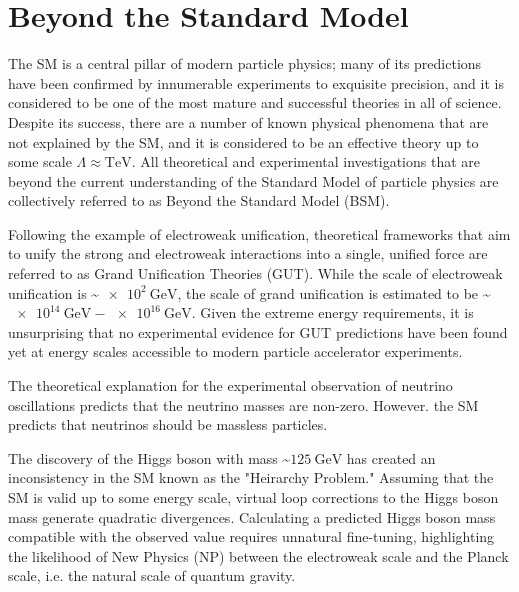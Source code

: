 \section{Beyond the Standard Model}
The SM is a central pillar of modern particle physics; many of its predictions have been confirmed by innumerable experiments to exquisite precision, and it is considered to be one of the most mature and successful theories in all of science.
Despite its success, there are a number of known physical phenomena that are not explained by the SM, and it is considered to be an effective theory up to some scale $\Lambda \approx \si{\TeV}$.
All theoretical and experimental investigations that are beyond the current understanding of the Standard Model of particle physics are collectively referred to as Beyond the Standard Model (BSM).

Following the example of electroweak unification, theoretical frameworks that aim to unify the strong and electroweak interactions into a single, unified force are referred to as Grand Unification Theories (GUT).
While the scale of electroweak unification is \sim$\SI{e2}{\GeV}$, the scale of grand unification is estimated to be \sim$\SI{e14}{\GeV} - \SI{e16}{\GeV}$.
Given the extreme energy requirements, it is unsurprising that no experimental evidence for GUT predictions have been found yet at energy scales accessible to modern particle accelerator experiments.

The theoretical explanation for the experimental observation of neutrino oscillations predicts that the neutrino masses are non-zero.
However. the SM predicts that neutrinos should be massless particles. 

The discovery of the Higgs boson with mass \sim$\SI{125}{\GeV}$ has created an inconsistency in the SM known as the "Heirarchy Problem."
Assuming that the SM is valid up to some energy scale, virtual loop corrections to the Higgs boson mass generate quadratic divergences.
Calculating a predicted Higgs boson mass compatible with the observed value requires unnatural fine-tuning, highlighting the likelihood of New Physics (NP) between the electroweak scale and the Planck scale, i.e. the natural scale of quantum gravity.

